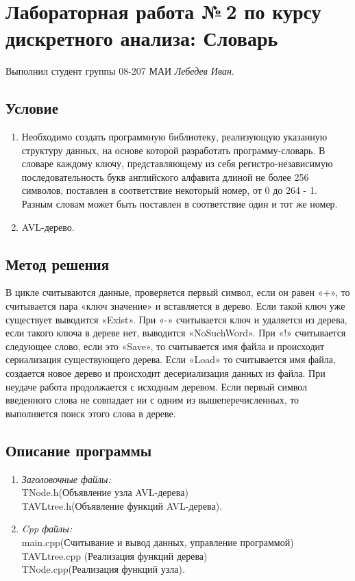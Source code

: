 \documentclass[12pt]{article}
\begin{document}
\section*{Лабораторная работа №\,2 по курсу дискретного анализа: Словарь}

Выполнил студент группы 08-207 МАИ \textit{Лебедев Иван}.

\subsection*{Условие}

\begin{enumerate}
\item Необходимо создать программную библиотеку, реализующую указанную структуру данных, на основе которой разработать программу-словарь. В словаре каждому ключу, представляющему из себя регистро-независимую последовательность букв английского алфавита длиной не более 256 символов, поставлен в соответствие некоторый номер, от 0 до 264 - 1. Разным словам может быть поставлен в соответствие один и тот же номер.
\item AVL-дерево.
\end{enumerate}

\subsection*{Метод решения}
В цикле считываются данные, проверяется первый символ, если он равен «+», то считывается пара «ключ значение» и вставляется в дерево. Если  такой ключ уже существует выводится «Exist».  При «-» считывается ключ и удаляется из дерева, если такого ключа в дереве нет, выводится «NoSuchWord». При «!» считывается следующее слово, если это «Save», то считывается имя файла и происходит сериализация существующего дерева. Если «Load» то считывается имя файла, создается новое дерево и происходит десериализация данных из файла. При неудаче работа продолжается с исходным деревом. Если первый символ введенного слова не совпадает ни с одним из вышеперечисленных, то выполняется поиск этого слова в дереве. 

\subsection*{Описание программы}

\begin{enumerate}
\item\textsl{Заголовочные файлы:}\\ TNode.h(Объявление узла AVL-дерева)\\ TAVLtree.h(Объявление функций AVL-дерева). 
\item\textsl{Cpp файлы:}\\ main.cpp(Считывание и вывод данных, управление программой)\\ TAVLtree.cpp (Реализация функций дерева)\\ TNode.cpp(Реализация функций узла).
\end{enumerate}
\end{document}
